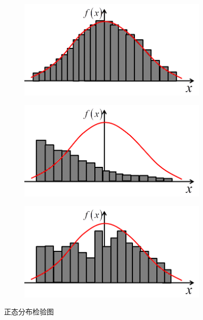         \begin{figure}[H]
            \centering
            \begin{subfigure}[b]{0.3\textwidth}
                \includegraphics[width=\textwidth]{images/Normal_distribution_test1.jpg}
                \caption{}
                \label{fig:正态分布检验图1}
            \end{subfigure}
            \begin{subfigure}[b]{0.3\textwidth}
                \includegraphics[width=\textwidth]{images/Normal_distribution_test2.jpg}
                \caption{}
                \label{fig:正态分布检验图2}
            \end{subfigure}
            \begin{subfigure}[b]{0.3\textwidth}
                \includegraphics[width=\textwidth]{images/Normal_distribution_test3.jpg}
                \caption{}
                \label{fig:正态分布检验图3}
            \end{subfigure}
            \caption{正态分布检验图}\label{fig:正态分布检验图}
        \end{figure}
